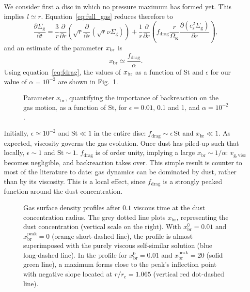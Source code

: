 \documentclass[a4paper,fleqn,usenatbib]{mnras}
\newcommand{\St}{\mathrm{St}}         %
\begin{document}
We consider first a disc in which no pressure maximum has formed yet. This implies $l \simeq r$. Equation~\ref{eq:full_gas} reduces therefore to
%
\begin{equation}
\frac{\partial \Sigma_\mathrm{g}}{\partial t} =  \frac{3}{r} \frac{\partial }{\partial r}\left( \sqrt{r} \frac{\partial}{\partial r} \left( \sqrt{r}\nu\Sigma_\mathrm{g} \right) \right) + \frac{1}{r} \frac{\partial}{\partial r} \left( f_\mathrm{drag}  \frac{r}{\Omega_\mathrm{K}} \frac{\partial \left(c_\mathrm{s}^{2} \Sigma_\mathrm{g} \right)}{\partial r} \right) ,
\label{eq:full_gas_1}
\end{equation}
%
and an estimate of the parameter $x_{\rm br}$ is
%
\begin{equation}
x_\mathrm{br} \simeq \frac{f_\mathrm{drag}}{\alpha}.
\label{eq:x_br_1}
\end{equation}
%
Using equation~\ref{eq:fdrag}, the values of $x_{\rm br}$ as a function of $\St$ and $\epsilon$ for our value of $\alpha = 10^{-2}$ are shown in Fig.~\ref{Fig:x_br}.
%
\begin{figure}
\centering
{}
\caption{Parameter $x_\mathrm{br}$, quantifying the importance of backreaction on the gas motion, as a function of $\St$, for $\epsilon=0.01$, 0.1 and 1, and $\alpha = 10^{-2}$.}
\label{Fig:x_br}
\end{figure}
%
Initially, $\epsilon \simeq 10^{-2}$ and $\St \ll 1$ in the entire disc: $f_\mathrm{drag}\sim\epsilon\,\St$ and $x_\mathrm{br}\ll1$. As expected, viscosity governs the gas evolution. Once dust has piled-up such that locally, $\epsilon\sim1$ and $\St\sim1$. $f_\mathrm{drag}$ is of order unity, implying a large $x_\mathrm{br}\sim1/\alpha$: $v_\mathrm{g,visc}$ becomes negligible, and backreaction takes over. This simple result is counter to most of the literature to date: gas dynamics can be dominated by dust, rather than by its viscosity. This is a local effect, since $f_\mathrm{drag}$ is a strongly peaked function around the dust concentration.
%
\begin{figure}
\centering
{}
\caption{Gas surface density profiles after $0.1$ viscous time at the dust concentration radius. The grey dotted line plots $x_\mathrm{br}$, representing the dust concentration (vertical scale on the right). With $x_\mathrm{br}^0=0.01$ and $x_\mathrm{br}^\mathrm{peak}=0$ (orange short-dashed line), the profile is almost superimposed with the purely viscous self-similar solution (blue long-dashed line). In the profile for  $x_\mathrm{br}^0=0.01$ and $x_\mathrm{br}^\mathrm{peak}=20$ (solid green line), a maximum forms close to the peak's inflection point with negative slope located at $r/r_\mathrm{c} = 1.065$ (vertical red dot-dashed line).}
\label{Fig:maxgas}
\end{figure}
%
\end{document}
